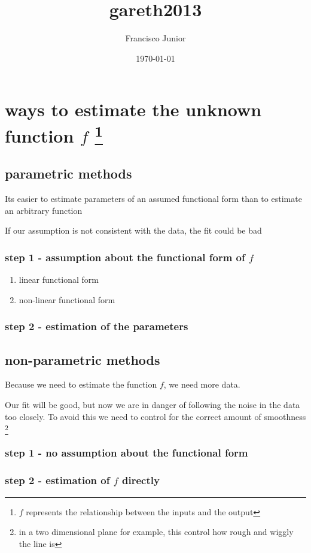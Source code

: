 \documentclass[11pt]{article}
\author{Francisco Junior}
\date{\today}
\title{gareth2013}
\begin{document}
\maketitle
\tableofcontents


\section{ways to estimate the unknown function $f$ \footnote{$f$ represents the relationship between the inputs and the output}}
\label{sec-1}

\subsection{parametric methods}
\label{sec-1-1}

Its easier to estimate parameters of an assumed functional form than to estimate an arbitrary function

If our assumption is not consistent with the data, the fit could be bad

\subsubsection{step 1 - assumption about the functional form of $f$}
\label{sec-1-1-1}

\begin{enumerate}
\item linear functional form
\label{sec-1-1-1-1}

\item non-linear functional form
\label{sec-1-1-1-2}
\end{enumerate}

\subsubsection{step 2 - estimation of the parameters}
\label{sec-1-1-2}

\subsection{non-parametric methods}
\label{sec-1-2}

Because we need to estimate the function $f$, we need more data.

Our fit will be good, but now we are in danger of following the noise in the data too closely. To avoid this we need to control for the correct amount of smoothness \footnote{in a two dimensional plane for example, this control how rough and wiggly the line is}

\subsubsection{step 1 - no assumption about the functional form}
\label{sec-1-2-1}

\subsubsection{step 2 - estimation of $f$ directly}
\label{sec-1-2-2}
\end{document}
